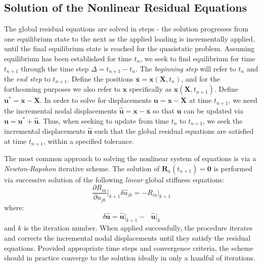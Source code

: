 \subsection{Solution of the Nonlinear Residual Equations}

The global residual equations are solved in steps - the solution progresses from one equilibrium state to the next as the applied loading is incrementally applied, until the final equilibrium state is reached for the quasistatic problem. Assuming equilibrium has been established for time $t_n$, we seek to find equilibrium for time $t_{n+1}$ through the time step $\Delta = t_{n+1} - t_{n}$. The \textit{beginning step} will refer to $t_n$ and the \textit{end step} to $t_{n+1}$. Define the positions $\overline{\bm{x}} = \bm{x}(\bm{X},t_n)$, and for the forthcoming purposes we also refer to ${\bm{x}}$ specifically as $\bm{x}(\bm{X},t_{n+1})$. Define ${\bm{u}}^* = \overline{\bm{x}} - \bm{X}$. In order to solve for displacements $\bm{u} = \bm{x} - \bm{X}$ at time $t_{n+1}$, we need the incremental nodal displacements $\hat{\bm{u}} = \bm{x} - \overline{\bm{x}}$ so that $\bm{u}$ can be updated via $\bm{u} = {\bm{u}}^* + \hat{\bm{u}}$. Thus, when seeking to update from time $t_n$ to $t_{n+1}$, we seek the incremental displacements $\hat{\bm{u}}$ such that the global residual equations are satisfied at time $t_{n+1}$, within a specified tolerance.

The most common approach to solving the nonlinear system of equations is via a \textit{Newton-Rapshon} iterative scheme. The solution of $\bm{R}_a(t_{n+1}) = \bm{0}$ is performed via successive solution of the following \textit{linear} global stiffness equations:
\begin{equation}
\frac{\partial R_{ia}}{\partial \hat{u}_{jb}} \bigg|_{k+1} \delta\hat{u}_{jb} = -R_{ia}\bigg|_{k+1}
\label{eqn:newtonraphson}
\end{equation}
where:
\begin{equation}
\delta\hat{\bm{u}} = \hat{\bm{u}}\big|_{k+1} - \text{\ }\hat{\bm{u}}\big|_k
\end{equation}
and $k$ is the iteration number. When applied successfully, the procedure iterates and corrects the incremental nodal displacements until they satisfy the residual equations. Provided appropriate time steps and convergence criteria, the scheme should in practice converge to the solution ideally in only a handful of iterations.

